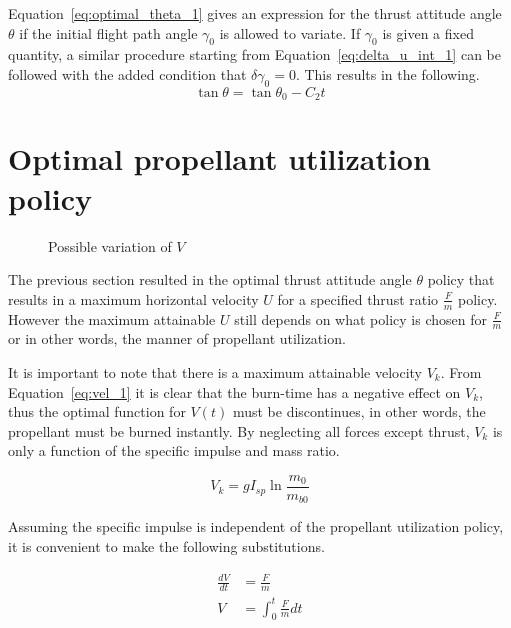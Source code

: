 Equation~\eqref{eq:optimal_theta_1} gives an expression for the thrust attitude angle $\theta$ if the initial flight path angle $\gamma_0$ is allowed to variate. If $\gamma_0$ is given a fixed quantity, a similar procedure starting from Equation~\eqref{eq:delta_u_int_1} can be followed with the added condition that $\delta \gamma_0=0$. This results in the following.
\begin{equation}
    \label{eq:optimal_theta_2}
    \tan\theta=\tan\theta_0-C_2t
\end{equation}


\section{Optimal propellant utilization policy}
\begin{figure}        
    \begin{center}        
        		
    \end{center}    
    \caption{Possible variation of $V$}
    \label{fig:possible_var_v}    
\end{figure}

The previous section resulted in the optimal thrust attitude angle $\theta$ policy that results in a maximum horizontal velocity $U$ for a specified thrust ratio $\frac{F}{m}$ policy. However the maximum attainable $U$ still depends on what policy is chosen for $\frac{F}{m}$ or in other words, the manner of propellant utilization.

It is important to note that there is a maximum attainable velocity $V_k$. From Equation~\eqref{eq:vel_1} it is clear that the burn-time has a negative effect on $V_k$, thus the optimal function for $V(t)$ must be discontinues, in other words, the propellant must be burned instantly. By neglecting all forces except thrust, $V_k$ is only a function of the specific impulse and mass ratio.

\begin{equation}
    V_k=gI_{sp} \ln{\frac{m_0}{m_{b0}}}
\end{equation}

Assuming the specific impulse is independent of the propellant utilization policy, it is convenient to make the following substitutions.

\begin{align}
    \frac{dV}{dt} &= \frac{F}{m} \\
    V &= \int_0^t{\frac{F}{m}} dt
\end{align}



